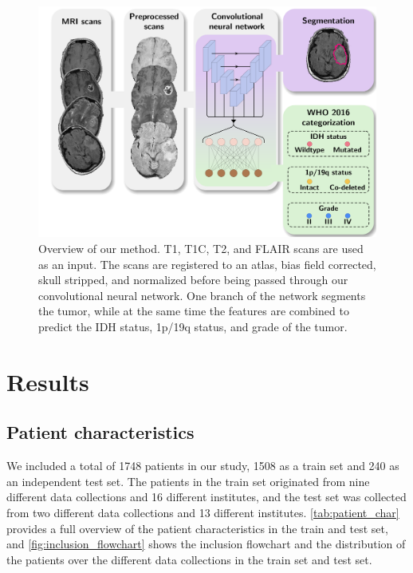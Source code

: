 \begin{figure}[htbp]
    \includegraphics[width=\textwidth]{Figures/Pipeline.pdf}
    \caption{Overview of our method.
    \acrshort{T1}, \acrshort{T1C}, \acrshort{T2}, and \acrshort{FLAIR} scans are used as an input.
    The scans are registered to an atlas, bias field corrected, skull stripped, and normalized before being passed through our convolutional neural network.
    One branch of the network segments the \gls{tumor}, while at the same time the features are combined to predict the \acrshort{IDH} status, 1p/19q status, and grade of the \gls{tumor}.
    }\label{fig:pipeline}
\end{figure}


\section{Results}
\subsection{Patient characteristics}
We included a total of 1748 patients in our study, 1508 as a train set and 240 as an independent test set.
The patients in the train set originated from nine different data collections and 16 different institutes, and the test set was collected from two different data collections and 13 different institutes.
\cref{tab:patient_char} provides a full overview of the patient characteristics in the train and test set, and \cref{fig:inclusion_flowchart} shows the inclusion flowchart and the distribution of the patients over the different data collections in the train set and test set.

